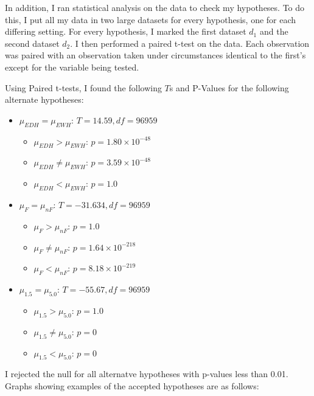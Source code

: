 \documentclass[aspectratio=169]{beamer}
\begin{document}
\begin{frame}
  In addition, I ran statistical analysis on the data to check my hypotheses. To do this, I put all my data in two large datasets for every hypothesis, one for each differing setting. For every hypothesis, I marked the first dataset $d_{1}$ and the second dataset $d_{2}$. I then performed a paired t-test on the data. Each observation was paired with  an observation taken under circumstances identical to the first's except for the variable being tested. 
\end{frame}

\begin{frame}
\end{frame}

\begin{frame}
  Using Paired t-tests, I found the following $T$s and P-Values for the following alternate hypotheses:
  \begin{itemize}
    \color{Blue}
  \item $\mu_{EDH}=\mu_{EWH}$: $T=14.59, df = 96959$
    \begin{itemize}
      \color{Blue}
    \item $\mu_{EDH}>\mu_{EWH}$: $p=1.80\times10^{-48}$
    \item $\mu_{EDH}\neq\mu_{EWH}$: $p=3.59\times10^{-48}$
    \item $\mu_{EDH}<\mu_{EWH}$: $p=1.0$
    \end{itemize}
  \item $\mu_{F}=\mu_{nF}$: $T=-31.634, df = 96959$
    \begin{itemize}
      \color{Blue}
    \item $\mu_{F}>\mu_{nF}$: $p=1.0$
    \item $\mu_{F}\neq\mu_{nF}$: $p=1.64\times10^{-218}$
    \item $\mu_{F}<\mu_{nF}$: $p=8.18\times10^{-219}$
    \end{itemize}
  \item $\mu_{1.5}=\mu_{5.0}$: $T=-55.67, df = 96959$
    \begin{itemize}
      \color{Blue}
    \item $\mu_{1.5}>\mu_{5.0}$: $p=1.0$
    \item $\mu_{1.5}\neq\mu_{5.0}$: $p=0$
    \item $\mu_{1.5}<\mu_{5.0}$: $p=0$
    \end{itemize}
  \end{itemize}
  I rejected the null for all alternatve hypotheses with p-values less than 0.01. Graphs showing examples of the accepted hypotheses are as follows:
\end{frame}
\end{document}
